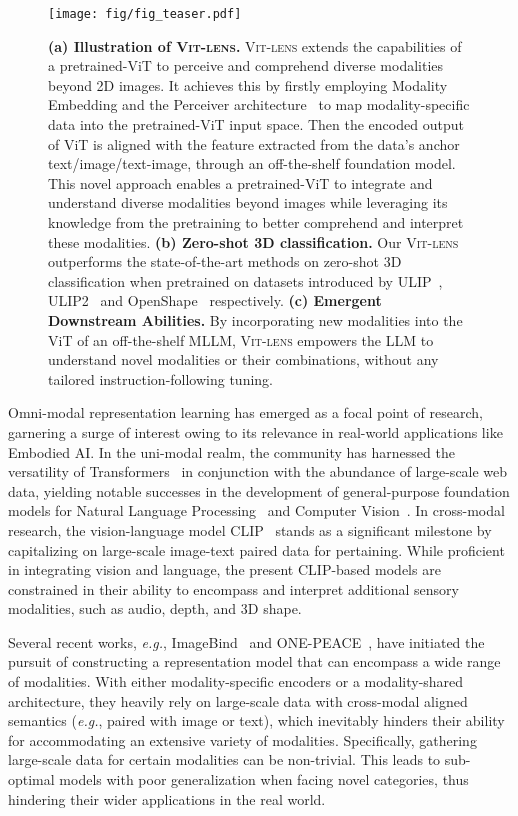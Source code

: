 \documentclass{article}
\newcommand{\ptvit}{pretrained-ViT\xspace}
\newcommand{\vit}{ViT\xspace}
\newcommand{\methodname}{{\scshape Vit-lens}\xspace}
\begin{document}
\begin{figure}[th]
  \centering
  \texttt{[image: fig/fig\_teaser.pdf]}
  \caption{\textbf{(a) Illustration of \methodname.} \methodname extends the capabilities of a \ptvit to perceive and comprehend diverse modalities beyond 2D images. It achieves this by firstly employing Modality Embedding and the Perceiver architecture~\cite{jaegle2021perceiver} to map modality-specific data into the \ptvit input space. Then the encoded output of \vit is aligned with the feature extracted from the data's anchor text/image/text-image, through an off-the-shelf foundation model.
  This novel approach enables a \ptvit to integrate and understand diverse modalities beyond images while leveraging its knowledge from the pretraining to better comprehend and interpret these modalities.
  \textbf{(b) Zero-shot 3D classification.} Our \methodname outperforms the state-of-the-art methods on zero-shot 3D classification when pretrained on datasets introduced by ULIP~\cite{xue2023ulip}, ULIP2~\cite{xue2023ulip2} and OpenShape~\cite{liu2023openshape} respectively.
  \textbf{(c) Emergent Downstream Abilities.} By incorporating new modalities into the \vit of an off-the-shelf MLLM, \methodname empowers the LLM to understand novel modalities or their combinations, without any tailored instruction-following tuning.
  }
  \label{fig:teaser}
\end{figure}

Omni-modal representation learning has emerged as a focal point of research, garnering a surge of interest owing to its relevance in real-world applications like Embodied AI.
In the uni-modal realm, the community has harnessed the versatility of Transformers~\cite{vaswani2017attention} in conjunction with the abundance of large-scale web data, yielding notable successes in the development of general-purpose foundation models for Natural Language Processing~\cite{bert,roberta,gpt1,gpt2,gpt3,openai2022chatgpt} and Computer Vision~\cite{dosovitskiy2020image,he2022masked,bao2021beit,peng2022beitv2,fang2023eva,fang2023eva02}.
In cross-modal research, the vision-language model CLIP~\cite{openai_clip} stands as a significant milestone by capitalizing on large-scale image-text paired data for pertaining.
While proficient in integrating vision and language, the present CLIP-based models are constrained in their ability to encompass and interpret additional sensory modalities, such as audio, depth, and 3D shape. 


Several recent works, \textit{e.g.}, ImageBind~\cite{girdhar2023imagebind} and ONE-PEACE~\cite{wang2023onepeace}, have initiated the pursuit of constructing a representation model that can encompass a wide range of modalities. 
With either modality-specific encoders or a modality-shared architecture, they heavily rely on large-scale data with cross-modal aligned semantics (\textit{e.g.}, paired with image or text), which inevitably hinders their ability for accommodating an extensive variety of modalities.
Specifically, gathering large-scale data for certain modalities can be non-trivial. This leads to sub-optimal models with poor generalization when facing novel categories, thus hindering their wider applications in the real world.
\end{document}
